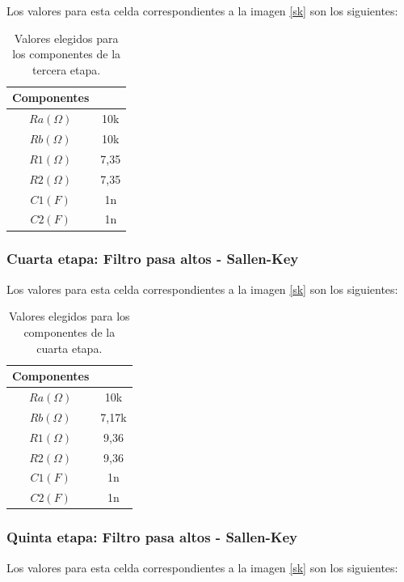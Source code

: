 Los valores para esta celda correspondientes a la imagen \ref{sk} son los siguientes:

\begin{table}[H] 
	\centering
	\begin{tabular}{c c}
		Componentes \\
		\hline
		$Ra (\Omega)$ &  10k \\
		$Rb (\Omega)$ & 10k  \\
		$R1 (\Omega)$ &  7,35 \\
		$R2 (\Omega)$ &  7,35 \\
		$C1 (F)$ & 1n \\
		$C2 (F)$ & 1n \\
		\hline
	\end{tabular}
	\caption{Valores elegidos para los componentes de la tercera etapa.}
	\label{componentes3}
\end{table}

\subsubsection{Cuarta etapa: Filtro pasa altos - Sallen-Key}

Los valores para esta celda correspondientes a la imagen \ref{sk} son los siguientes:

\begin{table}[H] 
	\centering
	\begin{tabular}{c c}
		Componentes \\
		\hline
		$Ra (\Omega)$ &  10k \\
		$Rb (\Omega)$ & 7,17k  \\
		$R1 (\Omega)$ &  9,36 \\
		$R2 (\Omega)$ &  9,36 \\
		$C1 (F)$ & 1n \\
		$C2 (F)$ & 1n \\
		\hline
	\end{tabular}
	\caption{Valores elegidos para los componentes de la cuarta etapa.}
	\label{componentes4}
\end{table}

\subsubsection{Quinta etapa: Filtro pasa altos - Sallen-Key}

Los valores para esta celda correspondientes a la imagen \ref{sk} son los siguientes:

